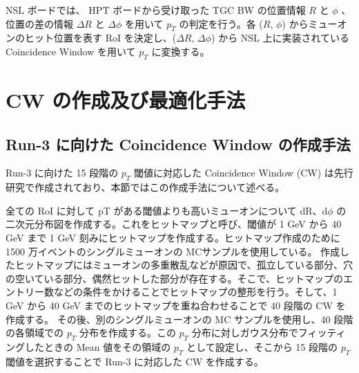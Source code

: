 NSL ボードでは、 HPT ボードから受け取った TGC BW の位置情報 $R$ と $\phi$ 、位置の差の情報 $\Delta R$ と $\Delta \phi$ を用いて $p_T$ の判定を行う。各 ($R$, $\phi$) からミューオンのヒット位置を表す RoI を決定し、($\Delta R$, $\Delta \phi$) から NSL 上に実装されている Coincidence Window を用いて $p_T$ に変換する。




\section{CW の作成及び最適化手法}\label{section:最適化}
\subsection{Run-3 に向けた Coincidence Window の作成手法}
Run-3 に向けた 15 段階の $p_T$ 閾値に対応した Coincidence Window (CW) は先行研究で作成されており、本節ではこの作成手法について述べる。

全ての RoI に対して pT がある閾値よりも高いミューオンについて dR、d$\phi$ の二次元分布図を作成する。これをヒットマップと呼び、閾値が 1 GeV から 40 GeV まで 1 GeV 刻みにヒットマップを作成する。ヒットマップ作成のために 1500 万イベントのシングルミューオンの MCサンプルを使用している。
作成したヒットマップにはミューオンの多重散乱などが原因で、孤立している部分、穴の空いている部分、偶然ヒットした部分が存在する。そこで、ヒットマップのエントリー数などの条件をかけることでヒットマップの整形を行う。そして、1 GeV から 40 GeV までのヒットマップを重ね合わせることで 40 段階の CW を作成する。
その後、別のシングルミューオンの MC サンプルを使用し、40 段階の各領域での $p_T$ 分布を作成する。この $p_T$ 分布に対しガウス分布でフィッティングしたときの Mean 値をその領域の $p_T$ として設定し、そこから 15 段階の $p_T$ 閾値を選択することで Run-3 に対応した CW を作成する。



